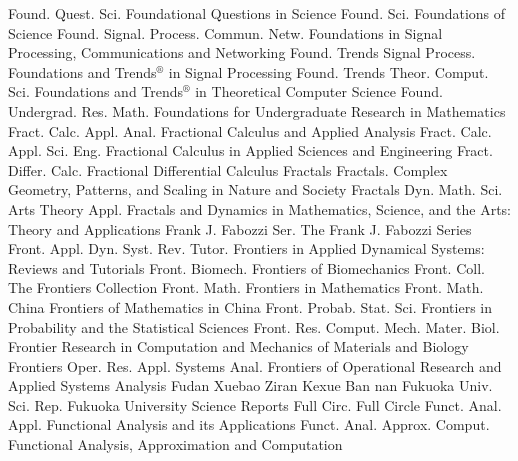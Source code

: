 {Found. Quest. Sci.}
{Foundational Questions in Science}
{Found. Sci.}
{Foundations of Science}
{Found. Signal. Process. Commun. Netw.}
{Foundations in Signal Processing, Communications and Networking}
{Found. Trends Signal Process.}
{Foundations and Trends${}^\circledR$ in Signal Processing}
{Found. Trends Theor. Comput. Sci.}
{Foundations and Trends${}^\circledR$ in Theoretical Computer Science}
{Found. Undergrad. Res. Math.}
{Foundations for Undergraduate Research in Mathematics}
{Fract. Calc. Appl. Anal.}
{Fractional Calculus and Applied Analysis}
{Fract. Calc. Appl. Sci. Eng.}
{Fractional Calculus in Applied Sciences and Engineering}
{Fract. Differ. Calc.}
{Fractional Differential Calculus}
{Fractals}
{Fractals. Complex Geometry, Patterns, and Scaling in Nature and Society}
{Fractals Dyn. Math. Sci. Arts Theory Appl.}
{Fractals and Dynamics in Mathematics, Science, and the Arts: Theory and Applications}
{Frank J. Fabozzi Ser.}
{The Frank J. Fabozzi Series}
{Front. Appl. Dyn. Syst. Rev. Tutor.}
{Frontiers in Applied Dynamical Systems: Reviews and Tutorials}
{Front. Biomech.}
{Frontiers of Biomechanics}
{Front. Coll.}
{The Frontiers Collection}
{Front. Math.}
{Frontiers in Mathematics}
{Front. Math. China}
{Frontiers of Mathematics in China}
{Front. Probab. Stat. Sci.}
{Frontiers in Probability and the Statistical Sciences}
{Front. Res. Comput. Mech. Mater. Biol.}
{Frontier Research in Computation and Mechanics of Materials and Biology}
{Frontiers Oper. Res. Appl. Systems Anal.}
{Frontiers of Operational Research and Applied Systems Analysis}
{Fudan Xuebao Ziran Kexue Ban}
{nan}
{Fukuoka Univ. Sci. Rep.}
{Fukuoka University Science Reports}
{Full Circ.}
{Full Circle}
{Funct. Anal. Appl.}
{Functional Analysis and its Applications}
{Funct. Anal. Approx. Comput.}
{Functional Analysis, Approximation and Computation}

